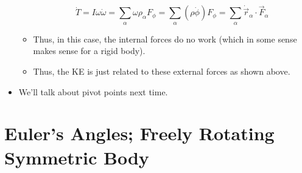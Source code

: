 \documentclass[../notes.tex]{subfiles}
\begin{document}
\begin{itemize}
\begin{itemize}
\begin{equation*}
            \dot{T} = I\omega\dot{\omega}
            = \sum_\alpha\omega\rho_\alpha F_\phi
            = \sum_\alpha(\rho\dot{\phi})F_\phi
            = \sum_\alpha\dot{\vec{r}}_\alpha\cdot\vec{F}_\alpha
        \end{equation*}
        \item Thus, in this case, the internal forces do no work (which in some sense makes sense for a rigid body).
        \item Thus, the KE is just related to these external forces as shown above.
    \end{itemize}
    \item We'll talk about pivot points next time.
\end{itemize}



\section{Euler's Angles; Freely Rotating Symmetric Body}
\end{document}
